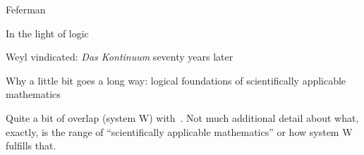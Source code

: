 \begin{plSection}{Feferman}
\begin{plSection}{In the light of logic}
\begin{plSection}{Weyl vindicated: \textit{Das Kontinuum} seventy years later}
\end{plSection}%
\begin{plSection}{Why a little bit goes a long way:
logical foundations of scientifically applicable mathematics}
\label{sec:Why_a_little_bit_goes_a_long_way}


Quite a bit of overlap (system W) 
with~\cite[ch 13]{Feferman:1998:LightOfLogic}.
Not much additional detail about what, exactly,
is the range of ``scientifically applicable mathematics''
or how system W fulfills that.

\end{plSection}%
\end{plSection}%
\end{plSection}%
 
